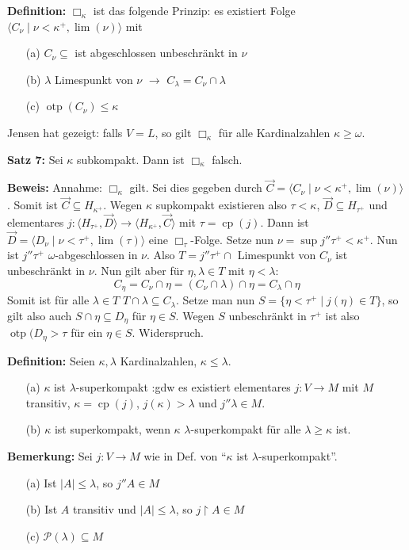 \documentclass[a4paper,fontsize=11pt]{scrartcl}
\newcommand{\otp}{\operatorname{otp}}
\newcommand{\cp}{\operatorname{cp}}
\begin{document}
{\bf Definition:} $\Box_\kappa$ ist das folgende Prinzip:
	es existiert Folge $\langle C_\nu\mid \nu<\kappa^+, \lim(\nu)\rangle$ mit 
	\begin{itemize}
		\item[(a)] $C_\nu\subseteq$ ist abgeschlossen unbeschränkt in $\nu$
		\item[(b)] $\lambda$ Limespunkt von $\nu$ $\to$ $C_{\lambda} =C_\nu\cap\lambda$
		\item[(c)] $\otp(C_\nu)\le\kappa$
	\end{itemize}

Jensen hat gezeigt: falls $V=L$, so gilt $\Box_\kappa$ für alle Kardinalzahlen $\kappa\ge\omega$.

{\bf Satz 7:} Sei $\kappa$ subkompakt. Dann ist $\Box_\kappa$ falsch.

	{\bf Beweis:} Annahme: $\Box_{\kappa}$ gilt.
		Sei dies gegeben durch $\vec C=\langle C_\nu\mid \nu<\kappa^+,\lim(\nu)\rangle$.
		Somit ist $\vec C\subseteq H_{\kappa^+}$.
		Wegen $\kappa$ supkompakt existieren also $\tau<\kappa$, $\vec D\subseteq H_{\tau^+}$ und elementares $j\colon \langle H_{\tau^+},\vec D\rangle\to \langle H_{\kappa^+},\vec C\rangle$ mit $\tau=\cp(j)$.
		Dann ist $\vec D=\langle D_\nu\mid \nu<\tau^+,\lim(\tau)\rangle$ eine $\Box_{\tau}$-Folge.
		Setze nun $\nu= \sup j''\tau^+<\kappa^+$.
		Nun ist $j''\tau^+$ $\omega$-abgeschlossen in $\nu$.
		Also $T=j''\tau^+\cap$ Limespunkt von $C_\nu$ ist unbeschränkt in $\nu$.
		Nun gilt aber für $\eta,\lambda\in T$ mit $\eta<\lambda$:
		\[ C_\eta= C_\nu\cap \eta= (C_\nu\cap\lambda)\cap\eta=C_\lambda\cap\eta \]
		Somit ist für alle $\lambda\in T$ $T\cap\lambda\subseteq C_\lambda$.
		Setze man nun $S=\{\eta<\tau^+\mid j(\eta)\in T\}$, so gilt also auch $S\cap \eta\subseteq D_{\eta}$ für $\eta\in S$.
		Wegen $S$ unbeschränkt in $\tau^+$ ist also $\otp(D_{\eta}>\tau$ für ein $\eta\in S$. Widerspruch.

{\bf Definition:} Seien $\kappa, \lambda$ Kardinalzahlen, $\kappa\le\lambda$.\begin{itemize}
		\item[(a)] $\kappa$ ist $\lambda$-superkompakt :gdw es existiert elementares $j\colon V\to M$ mit $M$ transitiv, $\kappa=\cp(j)$, $j(\kappa)>\lambda$ und $j''\lambda\in M$.
		\item[(b)] $\kappa$ ist superkompakt, wenn $\kappa$ $\lambda$-superkompakt für alle $\lambda\ge\kappa$ ist.
	\end{itemize}

{\bf Bemerkung:} Sei $j\colon V\to M$ wie in Def. von ``$\kappa$ ist $\lambda$-superkompakt''. \begin{itemize}
		\item[(a)] Ist $|A|\le\lambda$, so $j''A\in M$
		\item[(b)] Ist $A$ transitiv und $|A|\le \lambda$, so $j\upharpoonright A\in M$
		\item[(c)] $\mathcal P(\lambda)\subseteq M$
	\end{itemize}
\end{document}
